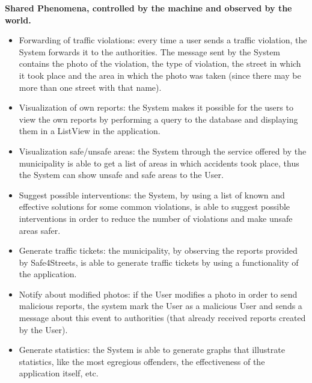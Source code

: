     \noindent\textbf{Shared Phenomena, controlled by the machine and observed by the world.}
      \begin{itemize}
          \item Forwarding of traffic violations: every time a user sends a traffic violation, the System forwards it to the authorities. The message sent by the System contains the photo of the violation, the type of violation, the street in which it took place and the area in which the photo was taken (since there may be more than one street with that name).
          \item Visualization of own reports: the System makes it possible for the users to view the own reports by performing a query to the database and displaying them in a ListView in the application.
          \item Visualization safe/unsafe areas: the System through the service offered by the municipality is able to get a list of areas in which accidents took place, thus the System can show unsafe and safe areas to the User.
          \item Suggest possible interventions: the System,  by using a list of known and effective solutions for some common violations, is able to suggest possible interventions in order to reduce the number of violations and make unsafe areas safer.
          \item Generate traffic tickets: the municipality, by observing the reports provided by Safe4Streets, is able to  generate traffic tickets by using a functionality of the application.
          \item Notify about modified photos: if the User modifies a photo in order to send malicious reports, the system mark the User as a malicious User and sends a message about this event to authorities (that already received reports created by the User). 
          \item Generate statistics: the System is able to generate graphs that illustrate statistics, like the most egregious offenders, the effectiveness of the application itself, etc.
          \end{itemize}
          
